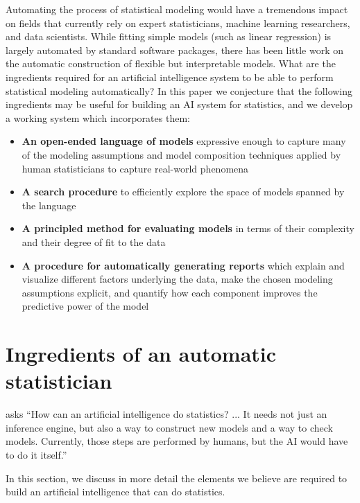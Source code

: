 Automating the process of statistical modeling would have a tremendous impact on fields that currently rely on expert statisticians, machine learning researchers, and data scientists.
While fitting simple models (such as linear regression) is largely automated by standard software packages, there has been little work on the automatic construction of flexible but interpretable models. 
What are the ingredients required for an artificial intelligence system to be able to perform statistical modeling automatically? 
In this paper we conjecture that the following ingredients may be useful for building an AI system for statistics, and we develop a working system which incorporates them:
\begin{itemize}
\item {\bf An open-ended language of models} expressive enough to
  capture many of the modeling assumptions and model composition
  techniques  applied by human statisticians to capture real-world phenomena
\item {\bf A search procedure} to efficiently explore the space of
  models spanned by the language
\item {\bf A principled method for evaluating models} in terms of their complexity and their degree of fit to the
  data
\item {\bf A procedure for automatically generating reports} which
  explain and visualize different factors underlying the data, make
  the chosen modeling assumptions explicit, and quantify how each
  component improves the predictive power of the model 
\end{itemize}





\section{Ingredients of an automatic statistician}
\label{sec:ingredients}
\citet{gelman2013philblogpost} asks ``How can an artificial intelligence do statistics? ... It needs not just an inference engine, but also a way to construct new models and a way to check models. Currently, those steps are performed by humans, but the AI would have to do it itself.''


In this section, we discuss in more detail the elements we believe are required to build an artificial intelligence that can do statistics.

